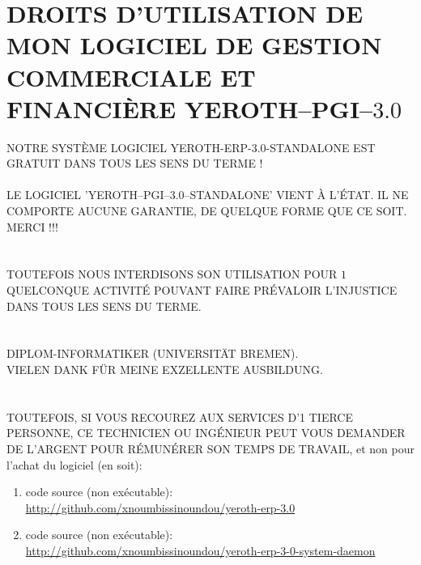 \chapter{DROITS D'UTILISATION DE MON LOGICIEL DE GESTION 
  COMMERCIALE ET FINANCI\`ERE YEROTH--PGI--$3.0$}


\textcolor{yerothColorRed}{NOTRE SYST\`EME LOGICIEL
YEROTH-ERP-3.0-STANDALONE EST GRATUIT DANS TOUS LES
SENS DU TERME !\\
\\
LE LOGICIEL 'YEROTH--PGI--3.0--STANDALONE' VIENT À
L'ÉTAT. IL NE COMPORTE AUCUNE GARANTIE, DE QUELQUE
FORME QUE CE SOIT.
\\
MERCI !!!\\
\\
\\
TOUTEFOIS NOUS INTERDISONS SON UTILISATION POUR
$1$ QUELCONQUE ACTIVIT\'E POUVANT FAIRE PR\'EVALOIR
L'INJUSTICE DANS TOUS LES SENS DU TERME.\\
\\
\\
DIPLOM-INFORMATIKER (UNIVERSITÄT BREMEN).\\
VIELEN DANK FÜR MEINE EXZELLENTE AUSBILDUNG}.\\
\\
\\
TOUTEFOIS, SI VOUS RECOUREZ AUX SERVICES D'1 TIERCE
PERSONNE, CE TECHNICIEN OU ING\'ENIEUR PEUT VOUS
DEMANDER DE L'ARGENT POUR R\'EMUN\'ERER SON TEMPS DE
TRAVAIL, et non pour l'achat du logiciel (en soit):

\begin{enumerate}[1.]
	\item code source (non ex\'ecutable): \\
		{\small \url{http://github.com/xnoumbissinoundou/yeroth-erp-3.0}}
		
	\item code source (non ex\'ecutable): \\
		{\small \url{http://github.com/xnoumbissinoundou/yeroth-erp-3-0-system-daemon}}
\end{enumerate}
